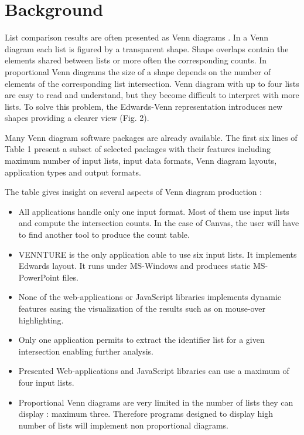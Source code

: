 \documentclass{bmcart}
\begin{document}

\section*{Background}

List comparison results are often presented as Venn diagrams \cite{Venn1880}. In
a Venn diagram each list is figured by a transparent shape. Shape overlaps
contain the elements shared between lists or more often the corresponding counts.
In proportional Venn diagrams the size of a shape depends on the number of
elements of the corresponding list intersection. Venn diagram with up to four 
lists are easy to read and understand, but they become difficult to interpret
with more lists. To solve this problem, the Edwards-Venn \cite{Edwards2004}
representation introduces new shapes providing a clearer view (Fig. 2).

Many Venn diagram software packages are already available. The first six lines
of Table 1 present a subset of selected packages with their features including 
maximum number of input lists, input data formats, Venn diagram layouts,
application types and output formats.

The table gives insight on several aspects of Venn diagram production :
\begin{itemize}
	\item All applications handle only one input format. Most of them use input
	lists and compute the intersection counts. In the case of Canvas, the user 
	will have to find another tool to produce the count table.
	\item VENNTURE is the only application able to use six input lists. It
	implements Edwards layout. It runs under MS-Windows and produces static
	MS-PowerPoint files.
	\item None of the web-applications or JavaScript libraries implements dynamic 
	features easing the visualization of the results such as on mouse-over highlighting.
	\item Only one application permits to extract the identifier list for a given 
	intersection enabling further analysis.
	\item Presented Web-applications and JavaScript libraries can use a maximum of 
	four input lists.
	\item Proportional Venn diagrams are very limited in the number of lists they 
	can display : maximum three.
	Therefore programs designed to display high number of lists will implement non 
	proportional diagrams.
\end{itemize}
\end{document}
